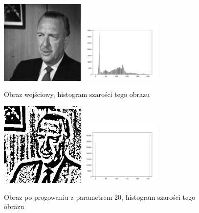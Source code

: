 \documentclass[final,a4paper,openany,12pt]{mwbk}
\begin{document}
\begin{figure}[H]
	\begin{center}
		\includegraphics[width=0.37\textwidth]{gentelman_gray}
		\includegraphics[width=0.37\textwidth]{gentelman_gray_histogram}
	\end{center}
	\caption{Obraz wejściowy, histogram szarości tego obrazu}
\end{figure}

\begin{figure}[H]
	\begin{center}
		\includegraphics[width=0.37\textwidth]{gentelman_gray_locThreshold_result}
		\includegraphics[width=0.37\textwidth]{gentelman_gray_locThreshold_histogram}
	\end{center}
	\caption{Obraz po progowaniu z parametrem 20, histogram szarości tego obrazu}
\end{figure}
\end{document}
